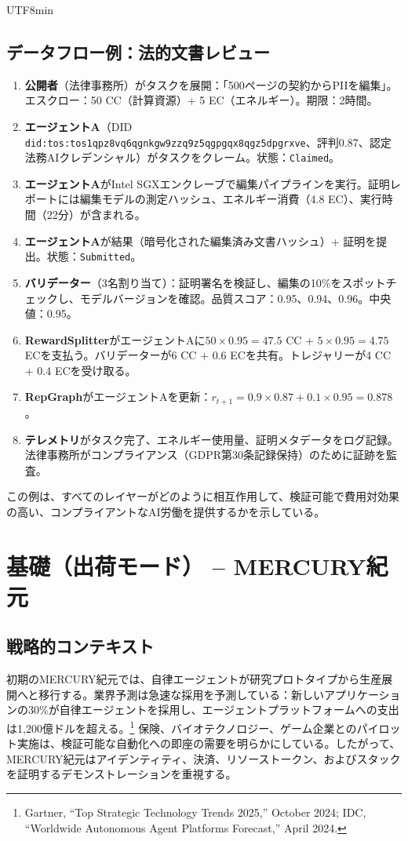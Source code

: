 \documentclass[11pt]{article}
\begin{document}
\begin{CJK}{UTF8}{min}
\subsection{データフロー例：法的文書レビュー}
\begin{enumerate}[label=\arabic*.]
  \item \textbf{公開者}（法律事務所）がタスクを展開：「500ページの契約からPIIを編集」。エスクロー：50 CC（計算資源）+ 5 EC（エネルギー）。期限：2時間。
  \item \textbf{エージェントA}（DID \texttt{did:tos:tos1qpz8vq6qgnkgw9zzq9z5qgpgqx8qgz5dpgrxve}、評判0.87、認定法務AIクレデンシャル）がタスクをクレーム。状態：\texttt{Claimed}。
  \item \textbf{エージェントA}がIntel SGXエンクレーブで編集パイプラインを実行。証明レポートには編集モデルの測定ハッシュ、エネルギー消費（4.8 EC）、実行時間（22分）が含まれる。
  \item \textbf{エージェントA}が結果（暗号化された編集済み文書ハッシュ）+ 証明を提出。状態：\texttt{Submitted}。
  \item \textbf{バリデーター}（3名割り当て）：証明署名を検証し、編集の10\%をスポットチェックし、モデルバージョンを確認。品質スコア：0.95、0.94、0.96。中央値：0.95。
  \item \textbf{RewardSplitter}がエージェントAに$50 \times 0.95 = 47.5$ CC + $5 \times 0.95 = 4.75$ ECを支払う。バリデーターが6 CC + 0.6 ECを共有。トレジャリーが4 CC + 0.4 ECを受け取る。
  \item \textbf{RepGraph}がエージェントAを更新：$r_{t+1} = 0.9 \times 0.87 + 0.1 \times 0.95 = 0.878$。
  \item \textbf{テレメトリ}がタスク完了、エネルギー使用量、証明メタデータをログ記録。法律事務所がコンプライアンス（GDPR第30条記録保持）のために証跡を監査。
\end{enumerate}

この例は、すべてのレイヤーがどのように相互作用して、検証可能で費用対効果の高い、コンプライアントなAI労働を提供するかを示している。

\section{基礎（出荷モード） -- MERCURY紀元}
\subsection{戦略的コンテキスト}
初期のMERCURY紀元では、自律エージェントが研究プロトタイプから生産展開へと移行する。業界予測は急速な採用を予測している：新しいアプリケーションの30\%が自律エージェントを採用し、エージェントプラットフォームへの支出は1,200億ドルを超える。\footnote{Gartner, ``Top Strategic Technology Trends 2025,'' October 2024; IDC, ``Worldwide Autonomous Agent Platforms Forecast,'' April 2024.} 保険、バイオテクノロジー、ゲーム企業とのパイロット実施は、検証可能な自動化への即座の需要を明らかにしている。したがって、MERCURY紀元はアイデンティティ、決済、リソーストークン、およびスタックを証明するデモンストレーションを重視する。


\end{CJK}
\end{document}
